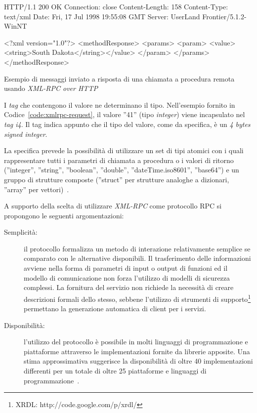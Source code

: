 \begin{program}
\begin{verbatimtab}
HTTP/1.1 200 OK
Connection: close
Content-Length: 158
Content-Type: text/xml
Date: Fri, 17 Jul 1998 19:55:08 GMT
Server: UserLand Frontier/5.1.2-WinNT


<?xml version="1.0"?>
<methodResponse>
   <params>
      <param>
         <value><string>South Dakota</string></value>
         </param>
      </params>
   </methodResponse>
\end{verbatimtab}
\caption{Esempio di messaggi inviato a risposta di una chiamata a procedura remota usando \emph{XML-RPC over HTTP}}\label{code:xmlrpc-response}
\end{program}

I \emph{tag} che contengono il valore ne determinano il tipo. Nell'esempio fornito in Codice~\ref{code:xmlrpc-request}, il valore ''41'' (tipo \emph{integer}) viene incapsulato nel \emph{tag i4}. Il tag indica appunto che il tipo del valore, come da specifica, è un \emph{4 bytes signed integer}.

La specifica prevede la possibilità di utilizzare un set di tipi atomici con i quali rappresentare tutti i parametri di chiamata a procedura o i valori di ritorno (''integer'', ''string'', ''boolean'', ''double'', ''dateTime.iso8601'', ''base64'') e un gruppo di strutture composte (''struct'' per strutture analoghe a dizionari, ''array'' per vettori)~\cite{xmlrpcspec}.

A supporto della scelta di utilizzare \emph{XML-RPC} come protocollo RPC si propongono le seguenti argomentazioni:
\begin{description}
	\item[Semplicità:] il protocollo formalizza un metodo di interazione relativamente semplice se comparato con le alternative disponibili. Il trasferimento delle informazioni avviene nella forma di parametri di input o output di funzioni ed il modello di comunicazione non forza l'utilizzo di modelli di sicurezza complessi. La fornitura del servizio non richiede la necessità di creare descrizioni formali dello stesso, sebbene l'utilizzo di strumenti di supporto\footnote{XRDL: http://code.google.com/p/xrdl/} permettano la generazione automatica di client per i servizi.
	\item[Disponibilità:] l'utilizzo del protocollo è possibile in molti linguaggi di programmazione e piattaforme attraverso le implementazioni fornite da librerie apposite. Una stima approssimativa suggerisce la disponibilità di oltre 40 implementazioni differenti per un totale di oltre 25 piattaforme e linguaggi di programmazione~\cite{wikipedia-xmlrpc}.
\end{description}


